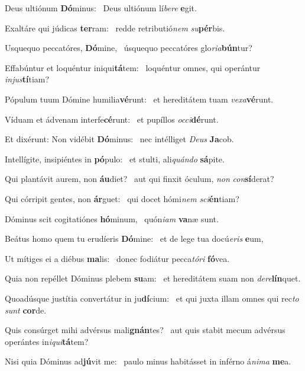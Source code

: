 \item Deus ultiónum \textbf{Dó}minus:~\psstar{} Deus ultiónum lí\textit{bere} \textbf{e}git.
\item Exaltáre qui júdicas \textbf{ter}ram:~\psstar{} redde retributió\textit{nem} \textit{su}\textbf{pér}bis.
\item Usquequo peccatóres, \textbf{Dó}mine,~\psstar{} úsquequo peccatóres glo\textit{ria}\textbf{bún}tur?
\item Effabúntur et loquéntur iniqui\textbf{tá}tem:~\psstar{} loquéntur omnes, qui operántur \textit{injus}\textbf{tí}tiam?
\item Pópulum tuum Dómine humilia\textbf{vé}runt:~\psstar{} et hereditátem tuam \textit{vexa}\textbf{vé}runt.
\item Víduam et ádvenam interfe\-\textbf{cé}runt:~\psstar{} et pupíllos \textit{occi}\textbf{dé}runt.
\item Et dixérunt: Non vidébit \textbf{Dó}minus:~\psstar{} nec intélliget \textit{Deus} \textbf{Ja}cob.
\item Intellígite, insipiéntes in \textbf{pó}pulo:~\psstar{} et stulti, ali\textit{quándo} \textbf{sá}pite.
\item Qui plantávit aurem, non \textbf{áu}diet?~\psstar{} aut qui finxit óculum, \textit{non} \textit{con}\textbf{sí}derat?
\item Qui córripit gentes, non \textbf{ár}guet:~\psstar{} qui docet hómi\textit{nem} \textit{sci}\textbf{én}tiam?
\item Dóminus scit cogitatiónes \textbf{hó}minum,~\psstar{} quón\textit{iam} \textbf{va}næ sunt.
\item Beátus homo quem tu erudíeris \textbf{Dó}mine:~\psstar{} et de lege tua docú\textit{eris} \textbf{e}um,
\item Ut mítiges ei a diébus \textbf{ma}lis:~\psstar{} donec fodiátur pecca\textit{tóri} \textbf{fó}vea.
\item Quia non repéllet Dóminus plebem \textbf{su}am:~\psstar{} et hereditátem suam non \textit{dere}\textbf{lín}quet.
\item Quoadúsque justítia convertátur in ju\textbf{dí}cium:~\psstar{} et qui juxta illam omnes qui rec\textit{to} \textit{sunt} \textbf{cor}de.
\item Quis consúrget mihi advérsus mali\textbf{gnán}tes?~\psstar{} aut quis stabit mecum advérsus operántes in\textit{iqui}\textbf{tá}tem?
\item Nisi quia Dóminus ad\textbf{jú}vit me:~\psstar{} paulo minus habitásset in inférno á\textit{nima} \textbf{me}a.
